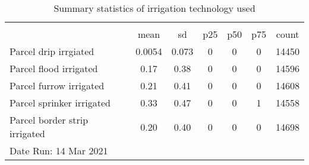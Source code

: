\begin{table}[htbp]\centering
\def\sym#1{\ifmmode^{#1}\else\(^{#1}\)\fi}
\caption{Summary statistics of irrigation technology used}
\begin{tabular*}{1.0\hsize}{@{\hskip\tabcolsep\extracolsep\fill}l*{1}{cccccc}}
\toprule
                                    &\multicolumn{6}{c}{}                                                         \\
                                    &        mean&          sd&         p25&         p50&         p75&       count\\
\midrule
Parcel drip irrgiated               &      0.0054&       0.073&           0&           0&           0&       14450\\
Parcel flood irrigated              &        0.17&        0.38&           0&           0&           0&       14596\\
Parcel furrow irrigated             &        0.21&        0.41&           0&           0&           0&       14608\\
Parcel sprinker irrigated           &        0.33&        0.47&           0&           0&           1&       14558\\
Parcel border strip irrigated       &        0.20&        0.40&           0&           0&           0&       14698\\
\bottomrule
\multicolumn{7}{l}{\footnotesize Date Run: 14 Mar 2021}\\
\end{tabular*}
\end{table}
